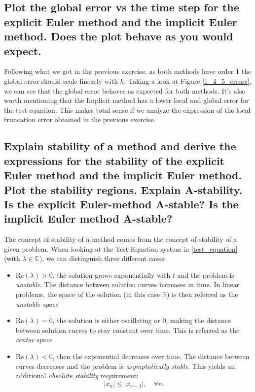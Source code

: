 \subsection{Plot the global error vs the time step for the explicit Euler method and
the implicit Euler method. Does the plot behave as you would expect.}
Following what we got in the previous exercise, as both methods have order 1 the global error should scale linearly with $h$. Taking a look at Figure \ref{1_4_5_errors}, we can see that the global error behaves as expected for both methods. It's also worth mentioning that the Implicit method has a lower local and global error for the test equation. This makes total sense if we analyze the expression of the local truncation error obtained in the previous exercise.


\subsection{Explain stability of a method and derive the expressions for the stability of
the explicit Euler method and the implicit Euler method. Plot the stability
regions. Explain A-stability. Is the explicit Euler-method A-stable? Is the
implicit Euler method A-stable?}

The concept of stability of a method comes from the concept of stability of a given problem. When looking at the Test Equation system in \ref{test_equation} (with $\lambda \in \mathbb{C}$), we can distinguish three different cases:
\begin{itemize}
    \item $\text{Re}(\lambda) > 0$, the solution grows exponentially with $t$ and the problem is \textit{unstable}. The distance between solution curves increases in time. In linear problems, the space of the solution (in this case $\mathbb{R}$) is then referred as the \textit{unstable space}
    \item $\text{Re}(\lambda) = 0$, the solution is either oscillating or 0, making the distance between solution curves to stay constant over time. This is referred as the \textit{center space}
    \item $\text{Re}(\lambda) < 0$, then the exponential decreases over time. The distance between curves decreases and the problem is \textit{asymptotically stable}. This yields an additional \textit{absolute stability} requirement:
    \begin{equation} \label{stability_requirement}
        |x_n| \leq |x_{n-1}|, \quad \forall n.
    \end{equation}
\end{itemize}

